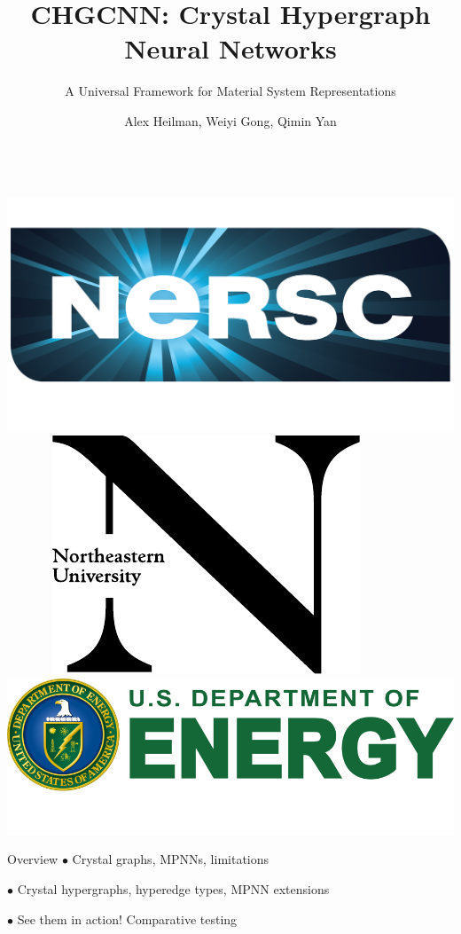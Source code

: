 \documentclass[11pt]{beamer}
\author{Alex Heilman, Weiyi Gong, Qimin Yan}
\title{CHGCNN: Crystal Hypergraph Neural Networks}
\subtitle{A Universal Framework for Material System Representations}
\institute{Department of Physics, Northeastern University}
\begin{document}
\begin{frame}
\titlepage
$\quad$ \includegraphics[scale=0.05]{nersc_logo.png} 
$\quad \quad\quad \ \ \ $\includegraphics[scale=0.2]{N.pdf}$\quad\quad\quad$
\includegraphics[scale=0.1]{doe_logo.png}
\end{frame}


\begin{frame}{Overview}
$\bullet$ Crystal graphs\pause , MPNNs\pause , limitations

\vspace{0.6cm}\pause

$\bullet$ Crystal hypergraphs\pause , hyperedge types\pause , MPNN extensions

\vspace{0.6cm}\pause

$\bullet$ See them in action! \pause Comparative testing
\end{frame}
\end{document}
